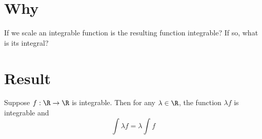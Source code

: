 
\section*{Why}

If we scale an integrable function is the resulting function integrable?
If so, what is its integral?

\section*{Result}

\begin{proposition}
Suppose $f: \R  \to \R $ is integrable.
Then for any $\lambda  \in \R $, the function $\lambda f$ is integrable and
\[
\int \lambda f = \lambda \int f
\]
\end{proposition}

\blankpage